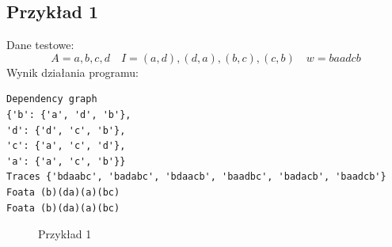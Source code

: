 \documentclass{article}
\begin{document}
        \subsection{Przykład 1}
            Dane testowe:
            $$
            A = {a, b, c, d}\quad
            I = {(a, d), (d, a), (b, c), (c, b)}\quad
            w = baadcb
            $$
            Wynik działania programu:
            \begin{lstlisting}
Dependency graph 
{'b': {'a', 'd', 'b'}, 
'd': {'d', 'c', 'b'}, 
'c': {'a', 'c', 'd'}, 
'a': {'a', 'c', 'b'}}
Traces {'bdaabc', 'badabc', 'bdaacb', 'baadbc', 'badacb', 'baadcb'}
Foata (b)(da)(a)(bc)
Foata (b)(da)(a)(bc)
            \end{lstlisting}
            \begin{figure}[h!]
                \centering
                \caption{Przykład 1}
            \end{figure}
            
    \newpage
\end{document}
